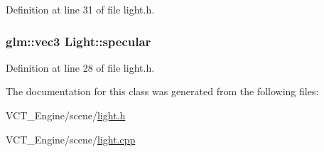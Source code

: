 Definition at line 31 of file light.\+h.

\hypertarget{class_light_aefcfb83a0540ddb885c2622061b28d7e}{}
\subsubsection[{specular}]{\setlength{\rightskip}{0pt plus 5cm}glm\+::vec3 Light\+::specular}\label{class_light_aefcfb83a0540ddb885c2622061b28d7e}


Definition at line 28 of file light.\+h.



The documentation for this class was generated from the following files\+:\begin{DoxyCompactItemize}
\item 
V\+C\+T\+\_\+\+Engine/scene/\hyperlink{light_8h}{light.\+h}\item 
V\+C\+T\+\_\+\+Engine/scene/\hyperlink{light_8cpp}{light.\+cpp}\end{DoxyCompactItemize}
